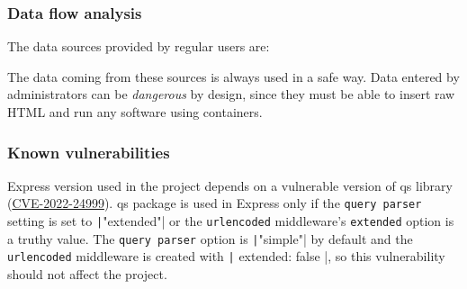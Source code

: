 \subsubsection{Data flow analysis}

The data sources provided by regular users are:

The data coming from these sources is always used in a safe way. Data entered by administrators can be \textit{dangerous} by design, since they must be able to insert raw HTML and run any software using containers.

\subsubsection{Known vulnerabilities}

Express version used in the project depends on a vulnerable version of qs library (\href{https://www.cve.org/CVERecord?id=CVE-2022-24999}{CVE-2022-24999}). qs package is used in Express only if the \texttt{query parser} setting is set to \texttt|"extended"| or the \texttt{urlencoded} middleware's \texttt{extended} option is a truthy value. The \texttt{query parser} option is \texttt|"simple"| by default and the \texttt{urlencoded} middleware is created with \texttt|{ extended: false }|, so this vulnerability should not affect the project.


